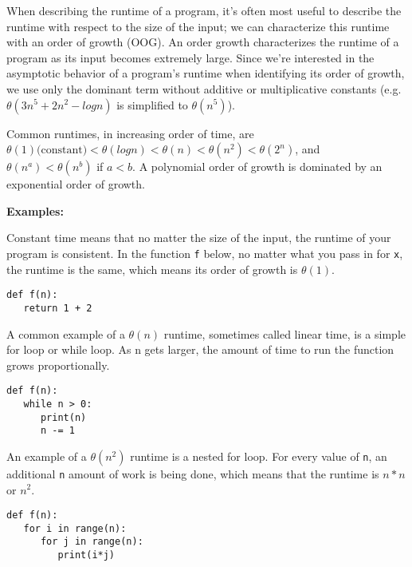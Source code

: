 \begin{blocksection}
When describing the runtime of a program, it’s often most useful to describe the runtime with respect to the size of the input; we can characterize this runtime with an order of growth (OOG).  An order growth characterizes the runtime of a program as its input becomes extremely large.  Since we’re interested in the asymptotic behavior of a program’s runtime when identifying its order of growth, we use only the dominant term without additive or multiplicative constants (e.g. $\theta(3n^5 + 2n^2 - log n)$ is simplified to $\theta(n^5)$).

Common runtimes, in increasing order of time, are $\theta(1) \text{(constant)} < \theta(log n) < \theta(n) < \theta(n^2) < \theta(2^n)$, and $\theta(n^a) < \theta(n^b)$ if $a < b$. A polynomial order of growth is dominated by an exponential order of growth.

\textbf{Examples:}

Constant time means that no matter the size of the input, the runtime of your program is consistent. In the function \lstinline{f} below, no matter what you pass in for \lstinline{x}, the runtime is the same, which means its order of growth is $\theta(1)$.
\vspace{1.5mm}
\begin{lstlisting}
def f(n):
   return 1 + 2
\end{lstlisting}
A common example of a $\theta(n)$ runtime, sometimes called linear time, is a simple for loop or while loop. As n gets larger, the amount of time to run the function grows proportionally.
\begin{lstlisting}
def f(n):
   while n > 0:
      print(n)
      n -= 1
\end{lstlisting}
An example of a $\theta(n^2)$ runtime is a nested for loop. For every value of \lstinline{n}, an additional \lstinline{n} amount of work is being done, which means that the runtime is $n*n$ or $n^2$.
\vspace{1.5mm}
\begin{lstlisting}
def f(n):
   for i in range(n):
      for j in range(n):
         print(i*j)
\end{lstlisting}

\end{blocksection}